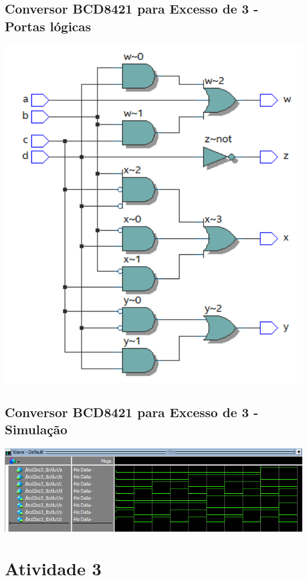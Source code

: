 \documentclass{article}
\begin{document}
\subsection{Conversor BCD8421 para Excesso de 3 - Portas lógicas}
\includegraphics[width=1\textwidth]{xs3-rtl.png}

\subsection{Conversor BCD8421 para Excesso de 3 - Simulação}
\includegraphics[width=1\textwidth]{xs3-wave.png}

\setcounter{section}{3}
\setcounter{subsection}{0}
\section*{Atividade 3}
\end{document}
